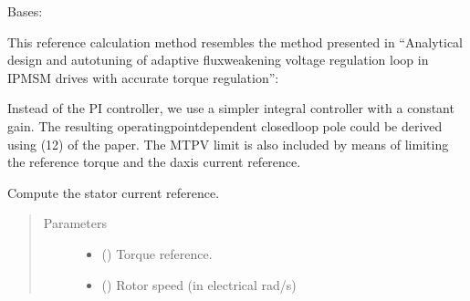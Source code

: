 \documentclass[letterpaper,10pt,english]{sphinxmanual}
\begin{document}

\begin{fulllineitems}
\label{\detokenize{control.sm:control.sm.vector.CurrentRef}}
\pysigstartsignatures
{}
\pysigstopsignatures
\sphinxAtStartPar
Bases: 

\sphinxAtStartPar
This reference calculation method resembles the method presented in
“Analytical design and autotuning of adaptive flux\sphinxhyphen{}weakening voltage
regulation loop in IPMSM drives with accurate torque regulation”:
\begin{quote}

\sphinxAtStartPar
{}
\end{quote}

\sphinxAtStartPar
Instead of the PI controller, we use a simpler integral controller with a
constant gain. The resulting operating\sphinxhyphen{}point\sphinxhyphen{}dependent closed\sphinxhyphen{}loop pole
could be derived using (12) of the paper. The MTPV limit is also included
by means of limiting the reference torque and the d\sphinxhyphen{}axis current reference.

\begin{fulllineitems}
\label{\detokenize{control.sm:control.sm.vector.CurrentRef.output}}
\pysigstartsignatures
{}
\pysigstopsignatures
\sphinxAtStartPar
Compute the stator current reference.
\begin{quote}\begin{description}
\item[{Parameters}] \leavevmode\begin{itemize}
\item {} 
\sphinxAtStartPar
{} () \textendash{} Torque reference.

\item {} 
\sphinxAtStartPar
{} () \textendash{} Rotor speed (in electrical rad/s)


\end{itemize}
\end{description}
\end{quote}
\end{fulllineitems}
\end{fulllineitems}
\end{document}
